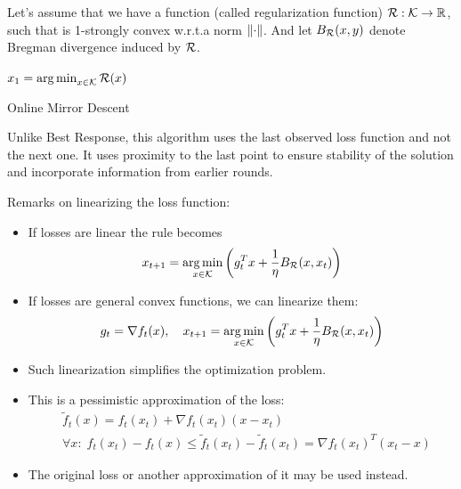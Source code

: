 \documentclass[11pt]{article}
\theoremstyle{definition}
\theoremstyle{definition}
\newcommand{\pth}[1]{\left( #1\right)}                 %
\newcommand{\brk}[1]{\left[ #1\right]}                 %
\newcommand{\wrt}{w.r.t.}
\newcommand{\strongcvx}[1]{#1-strongly convex}
\newcommand{\Kset}{\ensuremath{\K}}
\begin{document}
Let's assume that we have a function (called regularization function) $ \R : \Kset \to \reals $, such that \R{} is \strongcvx{1} \wrt a norm $\mathopen\| \cdot \mathclose\|$.
And let $B_{\mathcal R}(x, y)$ denote Bregman divergence induced by $\mathcal R$.

\begin{algorithm}[H]
\SetAlgoLined
\KwParam{ $ \R : \Kset \to \reals $ , $ \eta > 0 $ }
$ x_1 = \argmin_{x \in \Kset} \R(x) $
\;
 \For{$t \in \brk{T}$}{
  $ x_{t+1} = \argmin_{x \in \Kset} \pth{ f_t(x) + \frac{1}{\eta} B_\R(x, x_t) } $\;
 }
 \caption{Online Mirror Descent}
\end{algorithm}

Unlike Best Response, this algorithm uses the last observed loss function and not the next one. It uses proximity to the last point to ensure stability of the solution and incorporate information from earlier rounds.

Remarks on linearizing the loss function:
\begin{itemize}
\item If losses are linear the rule becomes 
\begin{equation*}
x_{t+1} = \argmin_{x \in \Kset} \pth{ g_t^T x + \frac{1}{\eta} B_\R(x, x_t) }
\end{equation*}

\item If losses are general convex functions, we can linearize them:
\begin{equation*}
g_t = \nabla f_t(x),
\quad
x_{t+1} = \argmin_{x \in \Kset} \pth{ g_t^T x + \frac{1}{\eta} B_\R(x, x_t) }
\end{equation*}

\item Such linearization simplifies the optimization problem.

\item This is a pessimistic approximation of the loss:
\begin{equation*}
\begin{aligned}
&\tilde{f}_t(x) = f_t(x_t) + \nabla f_t(x_t) \pth{x - x_t}
\\
&\forall x: \; f_t(x_t) - f_t(x) \leq \tilde{f}_t(x_t) - \tilde{f}_t(x_t) = \nabla f_t(x_t)^T (x_t - x)
\end{aligned}
\end{equation*}

\item The original loss or another approximation of it may be used instead.

\end{itemize}
\end{document}
